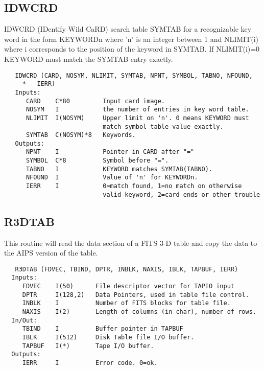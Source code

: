 \subsection{IDWCRD}
IDWCRD (IDentify Wild CaRD) search table SYMTAB for a recognizable
key word in the form KEYWORDn where 'n' is an integer between 1 and
NLIMIT(i) where i corresponds to the position of the keyword in
SYMTAB. If NLIMIT(i)=0 KEYWORD must match the SYMTAB entry exactly.
\begin{verbatim}
   IDWCRD (CARD, NOSYM, NLIMIT, SYMTAB, NPNT, SYMBOL, TABNO, NFOUND,
     *   IERR)
   Inputs:
      CARD    C*80         Input card image.
      NOSYM   I            the number of entries in key word table.
      NLIMIT  I(NOSYM)     Upper limit on 'n'. 0 means KEYWORD must
                           match symbol table value exactly.
      SYMTAB  C(NOSYM)*8   Keywords.
   Outputs:
      NPNT    I            Pointer in CARD after "="
      SYMBOL  C*8          Symbol before "=".
      TABNO   I            KEYWORD matches SYMTAB(TABNO).
      NFOUND  I            Value of 'n' for KEYWORDn.
      IERR    I            0=match found, 1=no match on otherwise
                           valid keyword, 2=card ends or other trouble
\end{verbatim}

\subsection{R3DTAB}
This routine will read the data section of a FITS 3-D table and copy
the data to the AIPS version of the table.
\begin{verbatim}
   R3DTAB (FDVEC, TBIND, DPTR, INBLK, NAXIS, IBLK, TAPBUF, IERR)
  Inputs:
     FDVEC    I(50)      File descriptor vector for TAPIO input
     DPTR     I(128,2)   Data Pointers, used in table file control.
     INBLK    I          Number of FITS blocks for table file.
     NAXIS    I(2)       Length of columns (in char), number of rows.
  In/Out:
     TBIND    I          Buffer pointer in TAPBUF
     IBLK     I(512)     Disk Table file I/O buffer.
     TAPBUF   I(*)       Tape I/O buffer.
  Outputs:
     IERR     I          Error code. 0=ok.
\end{verbatim}

